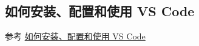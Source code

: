 
\subsection{如何安装、配置和使用 VS Code}

参考 \href{https://gitee.com/xkwxdyy/CCNUthesis/wikis/VScode%E7%9A%84%E5%AE%89%E8%A3%85%E9%85%8D%E7%BD%AE%E5%92%8C%E4%BD%BF%E7%94%A8}{如何安装、配置和使用 VS Code}